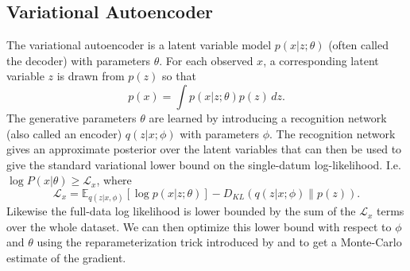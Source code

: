\documentclass{article} %
\newcommand{\KL}[2]{D_{KL} \left (#1 \| #2 \right )}
\begin{document}
\begin{center}
\begin{tabular}{c}
  \end{tabular}
\end{center}
\subsection{Variational Autoencoder}
The variational autoencoder is a latent variable model $p(x|z;\theta)$ (often called the decoder) with parameters $\theta$. For each observed $x$, a corresponding latent variable $z$ is drawn from $p(z)$ so that
\begin{equation}
    p(x) = \int p(x|z ; \theta) p(z) \, dz .
\end{equation}
The generative parameters $\theta$ are learned by introducing a recognition network (also called an encoder) $q(z | x ;\phi)$ with parameters $\phi$. The recognition network gives an approximate posterior over the latent variables that can then be used to give the standard variational lower bound \citep{saul_variational} on the single-datum log-likelihood. I.e. $\log P(x|\theta) \ge \mathcal{L}_x$, where
\begin{equation}
    \mathcal{L}_x = \mathbb{E}_{q(z | x, \phi)} \left [ \log p(x | z; \theta) \right ] - \KL{q(z | x ; \phi)}{p(z)}.
\end{equation}
Likewise the full-data log likelihood is lower bounded by the sum of the $\mathcal{L}_x$ terms over the whole dataset. We can then optimize this lower bound with respect to $\phi$ and $\theta$ using the reparameterization trick introduced by \citet{variational_autoencoder} and  \citet{reparam_paper} to get a Monte-Carlo estimate of the gradient.
\end{document}
